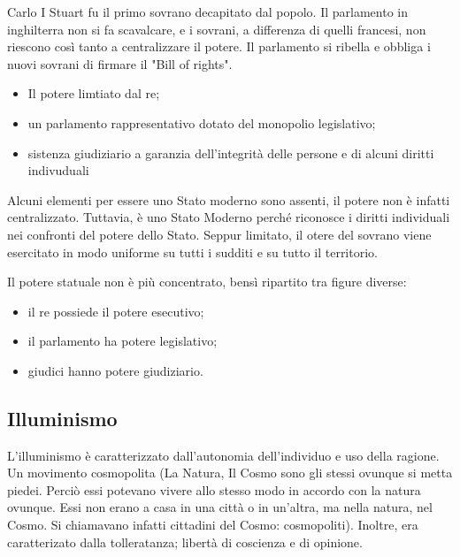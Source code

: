 \documentclass[a4paper]{article}
\begin{document}
Carlo I Stuart fu il primo sovrano decapitato dal popolo.
Il parlamento in inghilterra non si fa scavalcare, e i sovrani, a differenza di quelli francesi,
non riescono così tanto a centralizzare il potere.
Il parlamento si ribella e obbliga i nuovi sovrani di firmare il "Bill of rights".


\begin{itemize}
    \item Il potere limtiato dal re;
    \item un parlamento rappresentativo dotato del monopolio legislativo;
    \item sistenza giudiziario a garanzia dell'integrità delle persone e di alcuni diritti indivuduali
\end{itemize}

Alcuni elementi per essere uno Stato moderno sono assenti, il potere non è infatti centralizzato.
Tuttavia, è uno Stato Moderno perché riconosce i diritti individuali nei confronti del potere dello Stato.
Seppur limitato, il otere del sovrano viene esercitato in modo uniforme su tutti i sudditi e su tutto il territorio.

Il potere statuale non è più concentrato, bensì ripartito tra figure diverse:
\begin{itemize}
    \item il re possiede il potere esecutivo;
    \item il parlamento ha potere legislativo;
    \item giudici hanno potere giudiziario.
\end{itemize}


\subsection{Illuminismo}


L'illuminismo è caratterizzato dall'autonomia dell'individuo e uso della ragione.
Un movimento cosmopolita (La Natura, Il Cosmo sono gli stessi ovunque si metta piedei. Perciò essi
potevano vivere allo stesso modo in accordo con la natura ovunque. Essi non erano a casa in una città
o in un'altra, ma nella natura, nel Cosmo. Si chiamavano infatti cittadini del Cosmo: cosmopoliti).
Inoltre, era caratterizato dalla tolleratanza; libertà di coscienza e di opinione.
\end{document}
